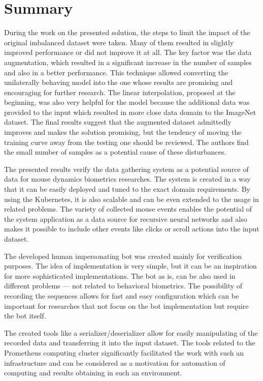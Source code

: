 \section{Summary}\label{sec:summary}
During the work on the presented solution, the steps to limit the impact of the original imbalanced dataset were taken.
Many of them resulted in slightly improved performance or did not improve it at all.
The key factor was the data augmentation, which resulted in a significant increase in the number of samples and also in a better performance.
This technique allowed converting the unilaterally behaving model into the one whose results are promising and encouraging for further research.
The linear interpolation, proposed at the beginning, was also very helpful for the model because the additional data was provided to the input which resulted in more close data domain to the ImageNet dataset.
The final results suggest that the augmented dataset admittedly improves and makes the solution promising, but the tendency of moving the training curve away from the testing one should be reviewed.
The authors find the small number of samples as a potential cause of these disturbances.

The presented results verify the data gathering system as a potential source of data for mouse dynamics biometrics researches.
The system is created in a way that it can be easily deployed and tuned to the exact domain requirements.
By using the Kubernetes, it is also scalable and can be even extended to the usage in related problems.
The variety of collected mouse events enables the potential of the system application as a data source for recursive neural networks and also makes it possible to include other events like clicks or scroll actions into the input dataset.

The developed human impersonating bot was created mainly for verification purposes.
The idea of implementation is very simple, but it can be an inspiration for more sophisticated implementations.
The bot as is, can be also used in different problems --- not related to behavioral biometrics.
The possibility of recording the sequences allows for fast and easy configuration which can be important for researches that not focus on the bot implementation but require the bot itself.

The created tools like a serializer/deserializer allow for easily manipulating of the recorded data and transferring it into the input dataset.
The tools related to the Prometheus computing cluster significantly facilitated the work with such an infrastructure and can be considered as a motivation for automation of computing and results obtaining in such an environment.
